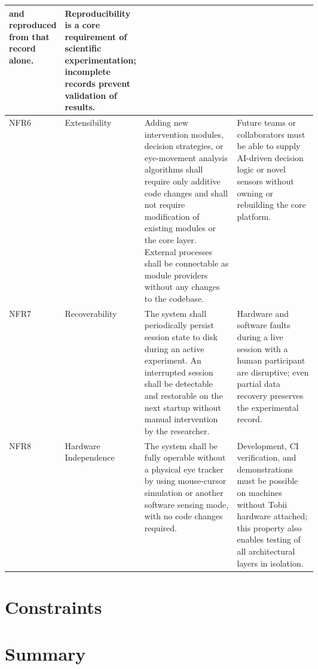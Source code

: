 \begin{table}[htbp]
\begin{tabularx}{\linewidth}{%
  p{0.08\linewidth}
  p{0.22\linewidth}
  p{0.30\linewidth}
  X
}
  and reproduced from that record alone. &
  Reproducibility is a core requirement of scientific experimentation;
  incomplete records prevent validation of results. \\
\midrule
NFR6 & Extensibility &
  Adding new intervention modules, decision strategies, or eye-movement
  analysis algorithms shall require only additive code changes and shall
  not require modification of existing modules or the core layer.
  External processes shall be connectable as module providers without
  any changes to the codebase. &
  Future teams or collaborators must be able to supply AI-driven decision
  logic or novel sensors without owning or rebuilding the core platform. \\
\midrule
NFR7 & Recoverability &
  The system shall periodically persist session state to disk during an
  active experiment.
  An interrupted session shall be detectable and restorable on the next
  startup without manual intervention by the researcher. &
  Hardware and software faults during a live session with a human
  participant are disruptive; even partial data recovery preserves the
  experimental record. \\
\midrule
NFR8 & Hardware Independence &
  The system shall be fully operable without a physical eye tracker by
  using mouse-cursor simulation or another software sensing mode, with
  no code changes required. &
  Development, CI verification, and demonstrations must be possible on
  machines without Tobii hardware attached; this property also enables
  testing of all architectural layers in isolation. \\
\bottomrule
\end{tabularx}
\end{table}

\section{Constraints}

\section{Summary}
